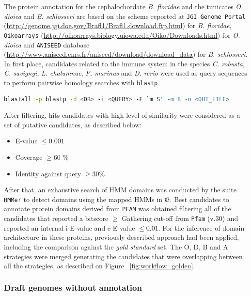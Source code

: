 \documentclass[11pt]{article}
\begin{document}
The protein annotation for the cephalochordate \textsl{B. floridae} and 
the tunicates \textsl{O. dioica} and \textsl{B. schlosseri} are based on the 
scheme reported at \texttt{JGI Genome Portal} 
(\url{http://genome.jgi.doe.gov/Brafl1/Brafl1.download.ftp.html}) for \textsl{B. 
floridae}, \texttt{Oikoarrays} 
(\url{http://oikoarrays.biology.uiowa.edu/Oiko/Downloads.html}) for \textsl{O. 
dioica} and \texttt{ANISEED} database 
(\url{http://www.aniseed.cnrs.fr/aniseed/download/download_data}) for \textsl{B. 
schlosseri}. In first place, candidates related to the immune system in the 
species \textit{C. robusta}, \textsl{C. savignyi}, \textsl{L. chalumnae}, 
\textsl{P. marinus} and \textit{D. rerio} were used as query sequences to 
perform pairwise homology searches with \texttt{blastp}.

\begin{lstlisting}[language=bash, breaklines=true]
blastall -p blastp -d <DB> -i <QUERY> -F `m S' -m 8 -o <OUT_FILE>
\end{lstlisting}

After filtering, hits candidates with high level of similarity were 
considered as a set of putative candidates, as described below:

\begin{itemize}
\item E-value $\leq 0.001$
\item Coverage $\geq 60$ \%
\item Identity against query $\geq 30$\%.
\end{itemize}

After that, an exhaustive search of HMM domains was conducted by the suite 
\texttt{HMMer} to detect domains using the mapped HMMs in 
$\boldsymbol{\mathfrak{G}}$. Best candidates to annotate protein domains 
derived from \texttt{PFAM} was obtained filtering all of the candidates that 
reported a bitscore $\geq$ Gathering cut-off from \texttt{Pfam} (v.30) and 
reported an internal i-E-value and c-E-value $\leq 0.01$. For the inference of 
domain architecture in these proteins, previously described approach had been 
applied, including the comparison against the \textsl{gold standard} set. The O, 
D, B and A strategies were merged generating the candidates that were 
overlapping between all the strategies, as described on Figure 
~\ref{fig:workflow_golden}.

\subsubsection*{Draft genomes without annotation}
\end{document}
